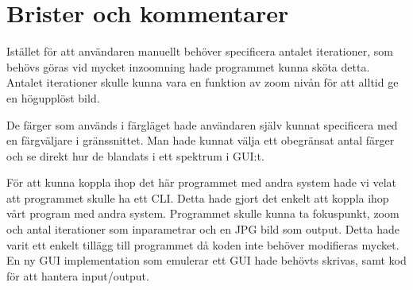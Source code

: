 \documentclass[a4paper]{article}
\begin{document}
\section{Brister och kommentarer}
Istället för att användaren manuellt behöver specificera antalet iterationer, som behövs göras vid mycket inzoomning hade programmet kunna sköta detta. Antalet iterationer skulle kunna vara en funktion av zoom nivån för att alltid ge en högupplöst bild.

De färger som används i färgläget hade användaren själv kunnat specificera med en färgväljare i gränssnittet. Man hade kunnat välja ett obegränsat antal färger och se direkt hur de blandats i ett spektrum i GUI:t.

För att kunna koppla ihop det här programmet med andra system hade vi velat att programmet skulle ha ett CLI. Detta hade gjort det enkelt att koppla ihop vårt program med andra system. Programmet skulle kunna ta fokuspunkt, zoom och antal iterationer som inparametrar och en JPG bild som output. Detta hade varit ett enkelt tillägg till programmet då koden inte behöver modifieras mycket. En ny GUI implementation som emulerar ett GUI hade behövts skrivas, samt kod för att hantera input/output.
\newline
\newline
\end{document}
